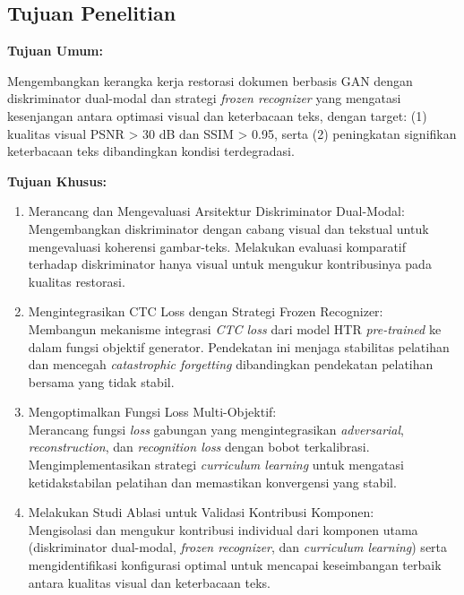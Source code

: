 \subsection{Tujuan Penelitian}
\label{subsec:tujuan-penelitian}

\textbf{Tujuan Umum:}

Mengembangkan kerangka kerja restorasi dokumen berbasis GAN dengan diskriminator dual-modal dan strategi \textit{frozen recognizer} yang mengatasi kesenjangan antara optimasi visual dan keterbacaan teks, dengan target: (1) kualitas visual PSNR > 30 dB dan SSIM > 0.95, serta (2) peningkatan signifikan keterbacaan teks dibandingkan kondisi terdegradasi.

\vspace{0.8em}
\textbf{Tujuan Khusus:}

\begin{enumerate}[label=\textbf{T\arabic*:}, leftmargin=1cm]
    \item Merancang dan Mengevaluasi Arsitektur Diskriminator Dual-Modal: \\
    Mengembangkan diskriminator dengan cabang visual dan tekstual untuk mengevaluasi koherensi gambar-teks. Melakukan evaluasi komparatif terhadap diskriminator hanya visual untuk mengukur kontribusinya pada kualitas restorasi.

    \item Mengintegrasikan CTC Loss dengan Strategi Frozen Recognizer: \\
    Membangun mekanisme integrasi \textit{CTC loss} dari model HTR \textit{pre-trained} ke dalam fungsi objektif generator. Pendekatan ini menjaga stabilitas pelatihan dan mencegah \textit{catastrophic forgetting} dibandingkan pendekatan pelatihan bersama yang tidak stabil.

    \item Mengoptimalkan Fungsi Loss Multi-Objektif: \\
    Merancang fungsi \textit{loss} gabungan yang mengintegrasikan \textit{adversarial}, \textit{reconstruction}, dan \textit{recognition loss} dengan bobot terkalibrasi. Mengimplementasikan strategi \textit{curriculum learning} untuk mengatasi ketidakstabilan pelatihan dan memastikan konvergensi yang stabil.

    \item Melakukan Studi Ablasi untuk Validasi Kontribusi Komponen: \\
    Mengisolasi dan mengukur kontribusi individual dari komponen utama (diskriminator dual-modal, \textit{frozen recognizer}, dan \textit{curriculum learning}) serta mengidentifikasi konfigurasi optimal untuk mencapai keseimbangan terbaik antara kualitas visual dan keterbacaan teks.
\end{enumerate}

